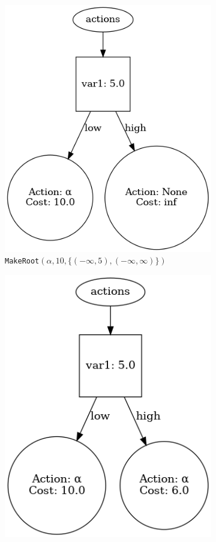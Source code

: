 \documentclass{article}
\begin{document}
\begin{figure}[H]
    \centering
    \caption{%
        Complete trace of converting the Q-tree in Figure~\ref{fig:QForest} to
        a single decision tree.
    }\label{fig:traceComplete}
    \begin{subfigure}[t]{0.31\textwidth}
        \centering
        \includegraphics[width=.8\textwidth]{exampleBuild0}
        \captionsetup{labelformat=empty}
        \caption{%
            \texttt{MakeRoot}$(\alpha, 10, \{ (-\infty, 5),
            (-\infty, \infty) \})$
        }
        \vspace{3ex}
    \end{subfigure}
    \begin{subfigure}[t]{0.3\textwidth}
        \centering
        \includegraphics[width=.8\textwidth]{exampleBuild1}

\end{subfigure}
\end{figure}
\end{document}
